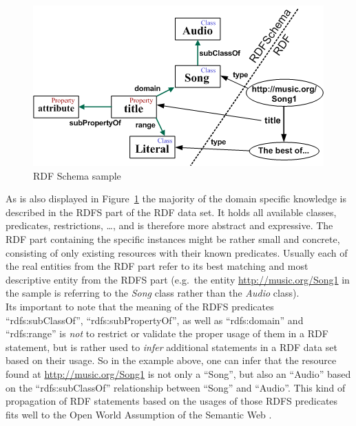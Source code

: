 \begin{figure}[H]
	\centering
	\includegraphics[width=0.9\columnwidth]{images/RDFSchema.png}
	\caption[RDF Schema sample]{RDF Schema sample \citep{RobertoSemWeb}}
	\label{fig:images_rdfs_sample}
\end{figure}

As is also displayed in Figure~\ref{fig:images_rdfs_sample} the majority of the domain specific knowledge is described in the \gls{RDFS} part of the \gls{RDF} data set. It holds all available classes, predicates, restrictions, \ldots, and is therefore more abstract and expressive. The \gls{RDF} part containing the specific instances might be rather small and concrete, consisting of only existing resources with their known predicates. Usually each of the real entities from the \gls{RDF} part refer to its best matching and most descriptive entity from the \gls{RDFS} part (e.g.\ the entity \url{http://music.org/Song1} in the sample is referring to the \emph{Song} class rather than the \emph{Audio} class). \\

Its important to note that the meaning of the \gls{RDFS} predicates ``rdfs:subClassOf'', ``rdfs:subPropertyOf'', as well as ``rdfs:domain'' and ``rdfs:range'' is \emph{not} to restrict or validate the proper usage of them in a \gls{RDF} statement, but is rather used to \emph{infer} additional statements in a \gls{RDF} data set based on their usage. So in the example above, one can infer that the resource found at \url{http://music.org/Song1} is not only a ``Song'', but also an ``Audio'' based on the ``rdfs:subClassOf'' relationship between ``Song'' and ``Audio''. This kind of propagation of \gls{RDF} statements based on the usages of those \gls{RDFS} predicates fits well to the Open World Assumption of the Semantic Web \citep[pg. 125-152]{allemang2011semantic}. \\

